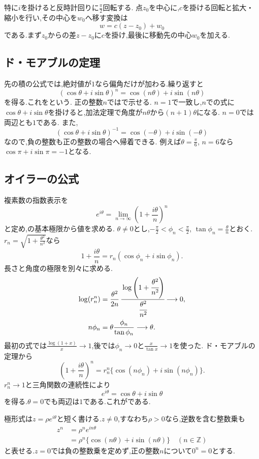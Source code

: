 特に$i$を掛けると反時計回りに$\frac{\pi}{2}$回転する.
点$z_0$を中心に,$c$を掛ける回転と拡大・縮小を行い,その中心を$w_0$へ移す変換は
\[
  w=c(z-z_0)+w_0
\]
である.まず$z_0$からの差$z-z_0$に$c$を掛け,最後に移動先の中心$w_0$を加える.

\subsection{ド・モアブルの定理}\label{節：ド・モアブルの定理}
先の積の公式では,絶対値が$1$なら偏角だけが加わる.繰り返すと
\[
  (\cos\theta+i\sin\theta)^n=\cos(n\theta)+i\sin(n\theta)
\]
を得る.これをという.
正の整数$n$ではで示せる.
$n=1$で一致し,$n$での式に$\cos\theta+i\sin\theta$を掛けると,加法定理で角度が$n\theta$から$(n+1)\theta$になる.
$n=0$では両辺とも$1$である.
また,
\[
  (\cos\theta+i\sin\theta)^{-1}=\cos(-\theta)+i\sin(-\theta)
\]
なので,負の整数も正の整数の場合へ帰着できる.
例えば$\theta=\frac{\pi}{6}$, $n=6$なら$\cos\pi+i\sin\pi=-1$となる.

\subsection{オイラーの公式}\label{節：オイラーの公式}
複素数の指数表示を
\[
  e^{i\theta}=\lim_{n\to\infty}\left(1+\frac{i\theta}{n}\right)^n
\]
と定め,の基本極限から値を求める.
$\theta\ne0$とし,$-\frac{\pi}{2}<\phi_n<\frac{\pi}{2}$, $\tan\phi_n=\frac{\theta}{n}$とおく.
$r_n=\sqrt{1+\frac{\theta^2}{n^2}}$なら
\[
  1+\frac{i\theta}{n}=r_n(\cos\phi_n+i\sin\phi_n).
\]
長さと角度の極限を別々に求める.
\begin{align*}
  \log(r_n^n)
  &=\frac{\theta^2}{2n}\,
  \cfrac{\log\left(1+\cfrac{\theta^2}{n^2}\right)}{\cfrac{\theta^2}{n^2}}\longrightarrow0,\\
  n\phi_n&=\theta\frac{\phi_n}{\tan\phi_n}\longrightarrow\theta.
\end{align*}
最初の式では$\frac{\log(1+x)}{x}\to1$,後では$\phi_n\to0$と$\frac{x}{\tan x}\to1$を使った.
ド・モアブルの定理から
\[
  \left(1+\frac{i\theta}{n}\right)^n
  =r_n^n\{\cos(n\phi_n)+i\sin(n\phi_n)\}.
\]
$r_n^n\to1$と三角関数の連続性により
\[
  e^{i\theta}=\cos\theta+i\sin\theta
\]
を得る.$\theta=0$でも両辺は$1$である.これがである.

極形式は$z=\rho e^{i\theta}$と短く書ける.$z\ne0$,すなわち$\rho>0$なら,逆数を含む整数乗も
\[
  \begin{aligned}
    z^n&=\rho^n e^{in\theta}\\
    &=\rho^n\{\cos(n\theta)+i\sin(n\theta)\}
    \quad(n\in\mathbb Z)
  \end{aligned}
\]
と表せる.$z=0$では負の整数乗を定めず,正の整数$n$について$0^n=0$とする.

